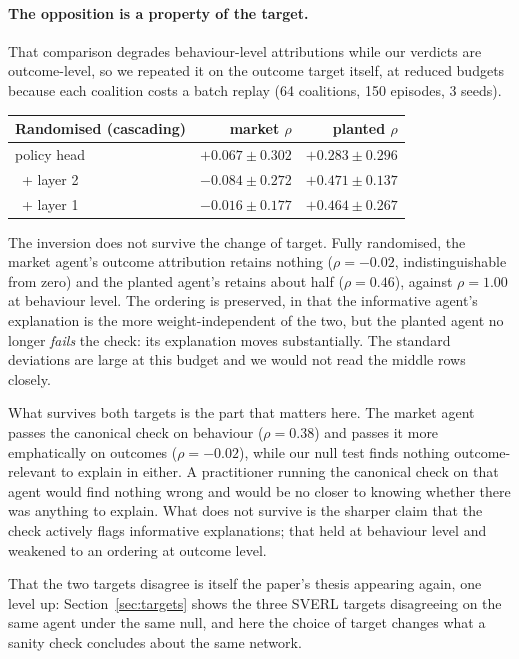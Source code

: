 \documentclass[10pt,twocolumn]{article}
\begin{document}
\paragraph{The opposition is a property of the target.}
That comparison degrades behaviour-level attributions while our verdicts are
outcome-level, so we repeated it on the outcome target itself, at reduced
budgets because each coalition costs a batch replay (64 coalitions, 150
episodes, 3 seeds).

\begin{center}\footnotesize
\begin{tabular}{lrr}
\toprule
Randomised (cascading) & market $\rho$ & planted $\rho$ \\
\midrule
policy head  & $+0.067 \pm 0.302$ & $+0.283 \pm 0.296$ \\
\, + layer 2 & $-0.084 \pm 0.272$ & $+0.471 \pm 0.137$ \\
\, + layer 1 & $\mathbf{-0.016 \pm 0.177}$ & $\mathbf{+0.464 \pm 0.267}$ \\
\bottomrule
\end{tabular}
\end{center}

The inversion does not survive the change of target. Fully randomised, the
market agent's outcome attribution retains nothing ($\rho=-0.02$, indis\-tinguishable
from zero) and the planted agent's retains about half ($\rho=0.46$), against
$\rho=1.00$ at behaviour level. The ordering is preserved, in that the
informative agent's explanation is the more weight-independent of the two, but
the planted agent no longer \emph{fails} the check: its explanation moves
substantially. The standard deviations are large at this budget and we would not
read the middle rows closely.

What survives both targets is the part that matters here. The market agent
passes the canonical check on behaviour ($\rho=0.38$) and passes it more
emphatically on outcomes ($\rho=-0.02$), while our null test finds nothing
outcome-relevant to explain in either. A practitioner running the canonical
check on that agent would find nothing wrong and would be no closer to knowing
whether there was anything to explain. What does not survive is the sharper
claim that the check actively flags informative explanations; that held at
behaviour level and weakened to an ordering at outcome level.

That the two targets disagree is itself the paper's thesis appearing again, one
level up: Section~\ref{sec:targets} shows the three SVERL targets disagreeing on
the same agent under the same null, and here the choice of target changes what a
sanity check concludes about the same network.
\end{document}
